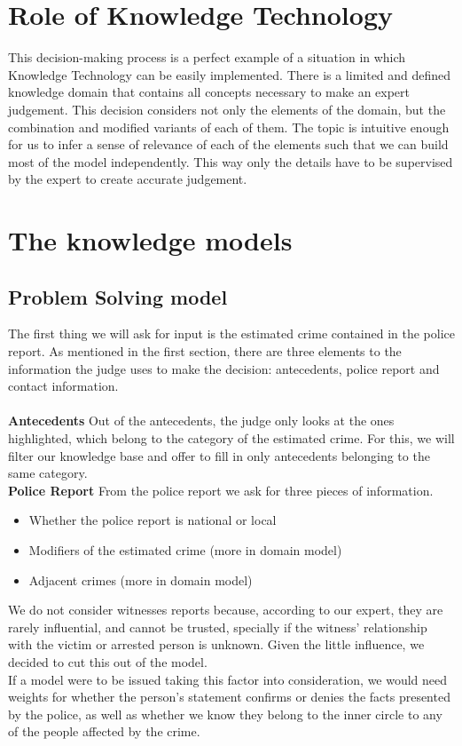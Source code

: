 \documentclass{article}
\begin{document}
\section{Role of Knowledge Technology}
This decision-making process is a perfect example of a situation in which Knowledge Technology can be easily implemented. There is a limited and defined knowledge domain that contains all concepts necessary to make an expert judgement. This decision considers not only the elements of the domain, but the combination and modified variants of each of them. 
The topic is intuitive enough for us to infer a sense of relevance of each of the elements such that we can build most of the model independently. This way only the details have to be supervised by the expert to create accurate judgement.

\section{The knowledge models}
\subsection{Problem Solving model}
The first thing we will ask for input is the estimated crime contained in the police report. As mentioned in the first section, there are three elements to the information the judge uses to make the decision: antecedents, police report and contact information.\\
\\
\textbf{Antecedents} Out of the antecedents, the judge only looks at the ones highlighted, which belong to the category of the estimated crime. For this, we will filter our knowledge base and offer to fill in only antecedents belonging to the same category.\\

\textbf{Police Report} From the police report we ask for three pieces of information. 
\begin{itemize}
    \item Whether the police report is national or local
    \item Modifiers of the estimated crime (more in domain model)
    \item Adjacent crimes (more in domain model)
\end{itemize}
We do not consider witnesses reports because, according to our expert, they are rarely influential, and cannot be trusted, specially if the witness' relationship with the victim or arrested person is unknown. Given the little influence, we decided to cut this out of the model. \\
If a model were to be issued taking this factor into consideration, we would need weights for whether the person's statement confirms or denies the facts presented by the police, as well as whether we know they belong to the inner circle to any of the people affected by the crime. \\
\end{document}
